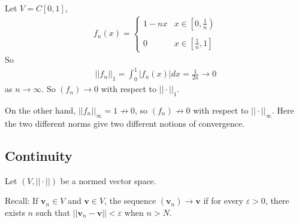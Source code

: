 \documentclass[a4paper]{article}
\begin{document}
\begin{eg}
Let $V=C\left[0,1\right]$,
\begin{equation*}
\begin{aligned}
f_n\left(x\right) = \left\{
\begin{array}{ll}
1-nx & x\in\left[0,\frac{1}{n}\right)\\\\
0 & x\in \left[\frac{1}{n},1\right]
\end{array}
\right.
\end{aligned}
\end{equation*}
So
\begin{equation*}
\begin{aligned}
||f_n||_1 = \int_0^1 |f_n\left(x\right)| dx = \frac{1}{2n} \to 0
\end{aligned}
\end{equation*}
as $n\to \infty$. So $\left(f_n\right) \to 0$ with respect to $||\cdot||_1$.

On the other hand, $||f_n||_\infty = 1 \not\to 0$, so $\left(f_n\right) \not\to 0$ with respect to $||\cdot||_\infty$. Here the two different norms give two different notions of convergence.
\end{eg}

\subsection{Continuity}
Let $\left(V,||\cdot||\right)$ be a normed vector space.

Recall: If $\mathbf{v}_n \in V$ and $\mathbf{v} \in V$, the sequence $\left(\mathbf{v}_n\right) \to \mathbf{v}$ if for every $\varepsilon>0$, there exists $n$ such that $||\mathbf{v}_n - \mathbf{v}|| < \varepsilon$ when $n>N$.
\end{document}
